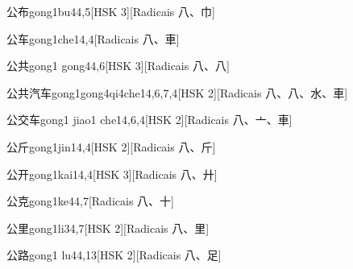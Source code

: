 \begin{entry}{公布}{gong1bu4}{4,5}[HSK 3][Radicais ⼋、⼱]
\end{entry}

\begin{entry}{公车}{gong1che1}{4,4}[Radicais ⼋、⾞]
\end{entry}

\begin{entry}{公共}{gong1 gong4}{4,6}[HSK 3][Radicais ⼋、⼋]
\end{entry}

\begin{entry}{公共汽车}{gong1gong4qi4che1}{4,6,7,4}[HSK 2][Radicais ⼋、⼋、⽔、⾞]
\end{entry}

\begin{entry}{公交车}{gong1 jiao1 che1}{4,6,4}[HSK 2][Radicais ⼋、⼇、⾞]
\end{entry}

\begin{entry}{公斤}{gong1jin1}{4,4}[HSK 2][Radicais ⼋、⽄]
\end{entry}

\begin{entry}{公开}{gong1kai1}{4,4}[HSK 3][Radicais ⼋、⼶]
\end{entry}

\begin{entry}{公克}{gong1ke4}{4,7}[Radicais ⼋、⼗]
\end{entry}

\begin{entry}{公里}{gong1li3}{4,7}[HSK 2][Radicais ⼋、⾥]
\end{entry}

\begin{entry}{公路}{gong1 lu4}{4,13}[HSK 2][Radicais ⼋、⾜]
\end{entry}

